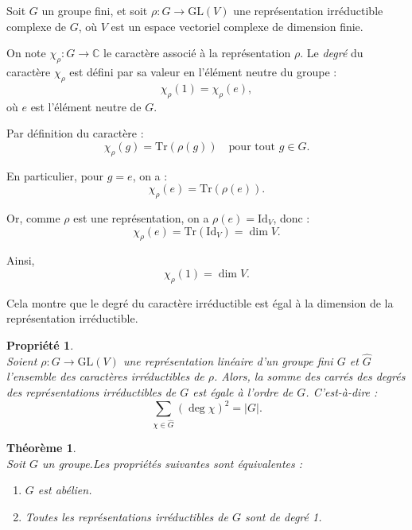 \documentclass[a4paper, 14pt]{report}
\newtheorem{propriety}{Propriété}[section]
\newtheorem{theorem}{Théorème}[section]
\begin{document}
\begin{onehalfspace}
{	Soit \( G \) un groupe fini, et soit \( \rho : G \to \mathrm{GL}(V) \) une représentation irréductible complexe de \( G \), où \( V \) est un espace vectoriel complexe de dimension finie.

On note \( \chi_\rho : G \to \mathbb{C} \) le caractère associé à la représentation \( \rho \). Le \emph{degré} du caractère \( \chi_\rho \) est défini par sa valeur en l’élément neutre du groupe :
\[
\chi_\rho(1) = \chi_\rho(e),
\]
où \( e \) est l’élément neutre de \( G \).

Par définition du caractère :
\[
\chi_\rho(g) = \mathrm{Tr}(\rho(g)) \quad \text{pour tout } g \in G.
\]

En particulier, pour \( g = e \), on a :
\[
\chi_\rho(e) = \mathrm{Tr}(\rho(e)).
\]

Or, comme \( \rho \) est une représentation, on a \( \rho(e) = \mathrm{Id}_V \), donc :
\[
\chi_\rho(e) = \mathrm{Tr}(\mathrm{Id}_V) = \dim V.
\]

Ainsi,
\[
\chi_\rho(1) = \dim V.
\]

Cela montre que le degré du caractère irréductible est égal à la dimension de la représentation irréductible.



\begin{propriety} \cite{renard2009groupes} \label{propr0}\\	
Soient \( \rho : G \rightarrow \mathrm{GL}(V) \) une représentation linéaire 
d'un groupe fini  \( G \) et \( \widehat{G} \) l'ensemble des caractères irréductibles de \( \rho \).  
Alors, la somme des carrés des degrés des représentations irréductibles de \( G \) est égale à l'ordre de \( G \). C'est-à-dire :
	\[
	\sum_{\chi \in \widehat{G}} (\deg \chi)^2 = |G|.
	\]
\end{propriety}


\begin{theorem}  \cite{serre1971representation} \\
	Soit  \( G \) un groupe.Les propriétés suivantes sont équivalentes :
	\begin{enumerate}
		\item[(i)] \( G \) est abélien.
		\item[(ii)] Toutes les représentations irréductibles de \( G \) sont de degré 1.
	\end{enumerate}
\end{theorem}

}
\end{onehalfspace}
\end{document}
